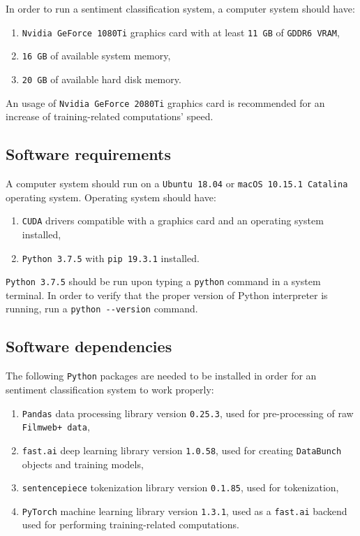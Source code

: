 In order to run a sentiment classification system, a computer system should have:

\begin{enumerate}
\item \lstinline{Nvidia GeForce 1080Ti} graphics card with at least \lstinline{11 GB} of \lstinline{GDDR6 VRAM},
\item \lstinline{16 GB} of available system memory,
\item \lstinline{20 GB} of available hard disk memory.
\end{enumerate}

An usage of \lstinline{Nvidia GeForce 2080Ti} graphics card is recommended for an increase of training-related computations' speed.

\subsection{Software requirements}

A computer system should run on a \lstinline{Ubuntu 18.04} or \lstinline{macOS 10.15.1 Catalina} operating system. Operating system should have:

\begin{enumerate}
\item \lstinline{CUDA} drivers compatible with a graphics card and an operating system installed,
\item \lstinline{Python 3.7.5} with \lstinline{pip 19.3.1} installed.
\end{enumerate}

\lstinline{Python 3.7.5} should be run upon typing a \lstinline{python} command in a system terminal. In order to verify that the proper version of Python interpreter is running, run a \lstinline{python --version} command.

\subsection{Software dependencies}

The following \lstinline{Python} packages are needed to be installed in order for an sentiment classification system to work properly:

\begin{enumerate}
\item \lstinline{Pandas} data processing library version \lstinline{0.25.3}, used for pre-processing of raw \lstinline{Filmweb+ data},
\item \lstinline{fast.ai} deep learning library version \lstinline{1.0.58}, used for creating \lstinline{DataBunch} objects and training models,
\item \lstinline{sentencepiece} tokenization library version \lstinline{0.1.85}, used for tokenization,
\item \lstinline{PyTorch} machine learning library version \lstinline{1.3.1}, used as a \lstinline{fast.ai} backend used for performing training-related computations.
\end{enumerate}

